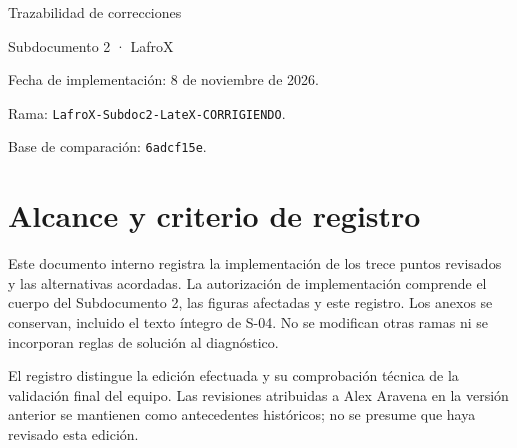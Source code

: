\documentclass[11pt,letterpaper]{article}
\begin{document}
{\sffamily\LARGE\color{lfx} Trazabilidad de correcciones}\par
{\large Subdocumento 2 · LafroX}\par
Fecha de implementación: 8 de noviembre de 2026.\par
Rama: \texttt{LafroX-Subdoc2-LateX-CORRIGIENDO}.\par
Base de comparación: \texttt{6adcf15e}.

\section*{Alcance y criterio de registro}
Este documento interno registra la implementación de los trece puntos revisados y las alternativas acordadas. La autorización de implementación comprende el cuerpo del Subdocumento 2, las figuras afectadas y este registro. Los anexos se conservan, incluido el texto íntegro de S-04. No se modifican otras ramas ni se incorporan reglas de solución al diagnóstico.

El registro distingue la edición efectuada y su comprobación técnica de la validación final del equipo. Las revisiones atribuidas a Alex Aravena en la versión anterior se mantienen como antecedentes históricos; no se presume que haya revisado esta edición.
\end{document}
